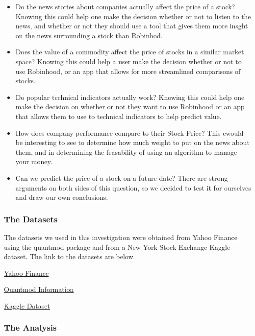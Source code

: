 \documentclass[]{article}
\begin{document}
\begin{itemize}
\item
  Do the news stories about companies actually affect the price of a
  stock? Knowing this could help one make the decision whether or not to
  listen to the news, and whether or not they should use a tool that
  gives them more insght on the news surrounding a stock than Robinhod.
\item
  Does the value of a commodity affect the price of stocks in a similar
  market space? Knowing this could help a user make the decision whether
  or not to use Robinhood, or an app that allows for more streamlined
  comparisons of stocks.
\item
  Do popular technical indicators actually work? Knowing this could help
  one make the decision on whether or not they want to use Robinhood or
  an app that allows them to use to technical indicators to help predict
  value.
\item
  How does company performance compare to their Stock Price? This cwould
  be interesting to see to determine how much weight to put on the news
  about them, and in determining the feasability of using an algorithm
  to manage your money.
\item
  Can we predict the price of a stock on a future date? There are strong
  arguments on both sides of this question, so we decided to test it for
  ourselves and draw our own conclusions.
\end{itemize}

\hypertarget{the-datasets}{%
\subsubsection{The Datasets}\label{the-datasets}}

 The datasets we used in this investigation were obtained from Yahoo
Finance using the quantmod package and from a New York Stock Exchange
Kaggle dataset. The link to the datasets are below.

\href{https://finance.yahoo.com/}{Yahoo Finance}

\href{https://cran.r-project.org/web/packages/quantmod/index.html}{Quantmod
Information}

\href{https://www.kaggle.com/dgawlik/nyse/version/3\#}{Kaggle Dataset}

\hypertarget{the-analysis}{%
\subsubsection{\texorpdfstring{\textbf{The
Analysis}}{The Analysis}}\label{the-analysis}}
\end{document}

